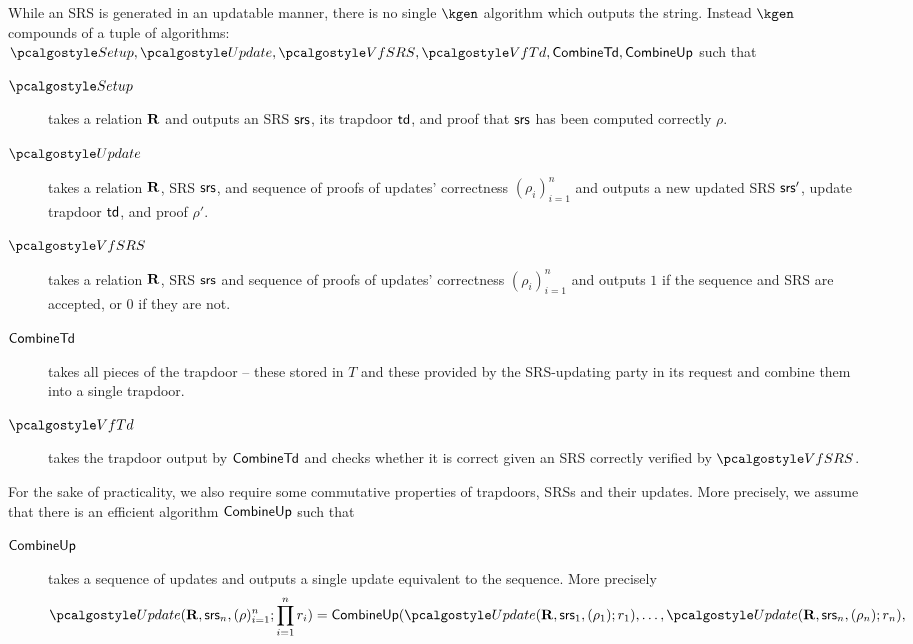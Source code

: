 \documentclass[runningheads,11pt]{llncs}
\begin{document}
While an SRS is generated in an updatable manner, there is no single $\kgen$
algorithm which outputs the string. Instead $\kgen$ compounds of a tuple of
algorithms:
$\algsetup, \algupdate, \algverifysrs, \algverifytd, \combinetd, \combineup$
such that
\begin{description}
\item[$\algsetup$] takes a relation $\mathbf{R}$ and outputs an SRS $\mathsf{srs}$, its
  trapdoor $\mathsf{td}$, and proof that $\mathsf{srs}$ has been computed correctly $\rho$.
\item[$\algupdate$] takes a relation $\mathbf{R}$, SRS $\mathsf{srs}$, and sequence of
  proofs of updates' correctness $(\rho_i)_{i = 1}^n$ and outputs a new updated
  SRS $\mathsf{srs}'$, update trapdoor $\mathsf{td}$, and proof $\rho'$.
\item[$\algverifysrs$] takes a relation $\mathbf{R}$, SRS $\mathsf{srs}$ and sequence of
  proofs of updates' correctness $(\rho_i)_{i = 1}^n$ and outputs $1$ if the
  sequence and SRS are accepted, or $0$ if they are not.
\item[$\mathsf{CombineTd}$] takes all pieces of the trapdoor -- these stored in
  $T$ and these provided by the SRS-updating party in its request and combine
  them into a single trapdoor.
\item[$\algverifytd$] takes the trapdoor output by $\mathsf{CombineTd}$ and checks
  whether it is correct given an SRS correctly verified by $\algverifysrs$. 
\end{description}

For the sake of practicality, we also require some commutative properties of
trapdoors, SRSs and their updates. More precisely, we assume that there is an
efficient algorithm $\mathsf{CombineUp}$ such that
\begin{description}
  \item[$\mathsf{CombineUp}$] takes a sequence of updates and outputs a
single update equivalent to the sequence. More precisely 
\begin{equation*}
  \algupdate(\REL, \srs_n, (\rho)_{i = 1}^{n}; \prod_{i = 1}^n r_i) =
  \combineup( \algupdate(\REL, \srs_1, (\rho_1); r_1), \ldots, \algupdate(\REL,
  \srs_n, (\rho_n); r_n),
\end{equation*}
\end{description}

\end{document}
